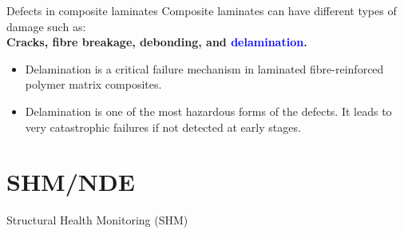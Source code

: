 \documentclass[10pt,aspectratio=169]{beamer} %
\begin{document}
\begin{frame}{Defects in composite laminates}
	\small
	Composite laminates can have different types of damage such as: \\
	\textbf{Cracks, fibre breakage, debonding, and \textcolor{blue}{delamination}.} \\ 
	\begin{minipage}[c]{.40\textwidth}
		\begin{itemize}
			\footnotesize
			\item Delamination is a critical failure mechanism in laminated fibre-reinforced polymer matrix composites.
			\item Delamination is one of the most hazardous forms of the defects. 
			It leads to very catastrophic failures if not detected at early stages.
		\end{itemize}
	\end{minipage}
	\hfill
	\begin{minipage}[c]{0.50\textwidth}
		\begin{figure}
		\end{figure}
	\end{minipage}
\end{frame}

\section{SHM/NDE}
\begin{frame}{Structural Health Monitoring (SHM)}
	\begin{figure}
	\end{figure}
\end{frame}
\end{document}
